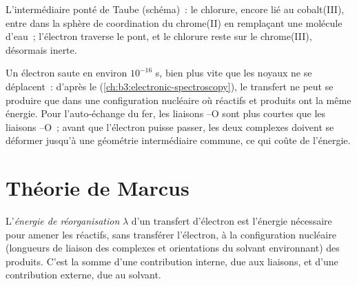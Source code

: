 \begin{omfigure}

{\small L'intermédiaire ponté de Taube (schéma)~: le chlorure, encore lié au
cobalt(III), entre dans la sphère de coordination du chrome(II) en
remplaçant une molécule d'eau~; l'électron traverse le pont, et le chlorure
reste sur le chrome(III), désormais inerte.}
\end{omfigure}

Un électron saute en environ $10^{-16}$ s, bien plus vite que les noyaux ne
se déplacent~: d'après le 
(\cref{ch:b3:electronic-spectroscopy}), le transfert ne peut se produire que
dans une configuration nucléaire où réactifs et produits ont la même
énergie. Pour l'auto-échange du fer, les liaisons --O sont plus
courtes que les liaisons --O~; avant que l'électron puisse
passer, les deux complexes doivent se déformer jusqu'à une géométrie
intermédiaire commune, ce qui coûte de l'énergie.

\section{Théorie de Marcus}

\begin{definition}\label{def:b3:complex-mechanisms:reorganisation}
L'\emph{énergie de réorganisation} $\lambda$
d'un transfert d'électron est l'énergie nécessaire pour amener les
réactifs, sans transférer l'électron, à la configuration nucléaire
(longueurs de liaison des complexes et orientations du solvant environnant)
des produits. C'est la somme d'une contribution interne, due aux liaisons,
et d'une contribution externe, due au solvant.
\end{definition}

